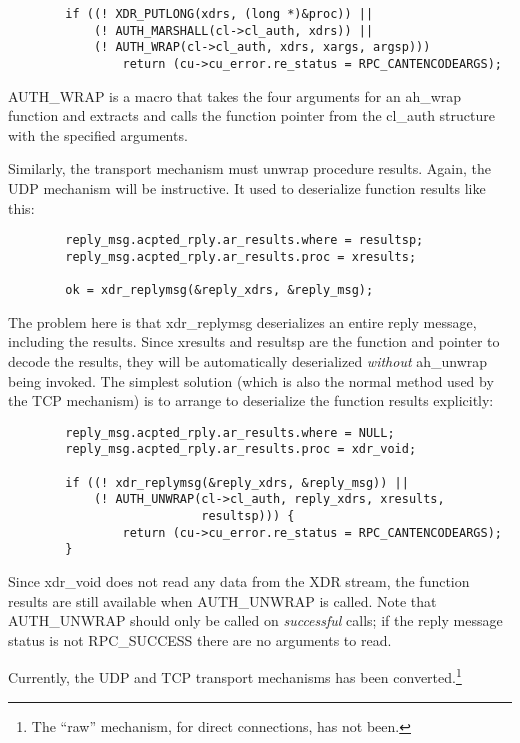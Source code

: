 \begin{verbatim}
        if ((! XDR_PUTLONG(xdrs, (long *)&proc)) ||
            (! AUTH_MARSHALL(cl->cl_auth, xdrs)) ||
            (! AUTH_WRAP(cl->cl_auth, xdrs, xargs, argsp)))
                return (cu->cu_error.re_status = RPC_CANTENCODEARGS);
\end{verbatim}

AUTH_WRAP is a macro that takes the four arguments for an ah_wrap
function and extracts and calls the function pointer from the cl_auth
structure with the specified arguments.

Similarly, the transport mechanism must unwrap procedure results.
Again, the UDP mechanism will be instructive.  It used to deserialize
function results like this:

\begin{verbatim}
        reply_msg.acpted_rply.ar_results.where = resultsp;
        reply_msg.acpted_rply.ar_results.proc = xresults;

        ok = xdr_replymsg(&reply_xdrs, &reply_msg);
\end{verbatim}

The problem here is that xdr_replymsg deserializes an entire reply
message, including the results.  Since xresults and resultsp are the
function and pointer to decode the results, they will be automatically
deserialized {\it without} ah_unwrap being invoked.  The simplest
solution (which is also the normal method used by the TCP mechanism)
is to arrange to deserialize the function results explicitly:

\begin{verbatim}
        reply_msg.acpted_rply.ar_results.where = NULL;
        reply_msg.acpted_rply.ar_results.proc = xdr_void;

        if ((! xdr_replymsg(&reply_xdrs, &reply_msg)) ||
            (! AUTH_UNWRAP(cl->cl_auth, reply_xdrs, xresults,
                           resultsp))) {
                return (cu->cu_error.re_status = RPC_CANTENCODEARGS);
        }
\end{verbatim}

Since xdr_void does not read any data from the XDR stream, the
function results are still available when AUTH_UNWRAP is called.  Note
that AUTH_UNWRAP should only be called on {\it successful} calls; if
the reply message status is not RPC_SUCCESS there are no arguments to
read.

Currently, the UDP and TCP transport mechanisms has been
converted.\footnote{The ``raw'' mechanism, for direct connections, has
not been.}


